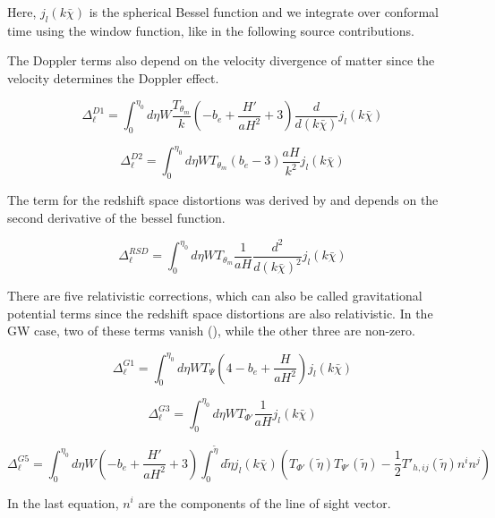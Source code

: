 Here, $j_l(k \bar{\chi})$ is the spherical Bessel function and we integrate over conformal time using the window function, like in the following source contributions.

The Doppler terms also depend on the velocity divergence of matter since the velocity determines the Doppler effect.

\begin{equation}
    \Delta_\ell^{D1}=\int_0^{\eta_0} d\eta W \frac{T_{\theta_m}}{k} \left(-b_e + \frac{H'}{aH^2}+3\right)\frac{d}{d(k\bar{\chi})} j_l(k \bar{\chi})
\end{equation}

\begin{equation}
    \Delta_\ell^{D2}=\int_0^{\eta_0} d\eta W T_{\theta_m}(b_e-3) \frac{aH}{k^2} j_l(k \bar{\chi})
\end{equation}

The term for the redshift space distortions was derived by \cite{kaiser_clustering_1987} and depends on the second derivative of the bessel function.

\begin{equation}
    \Delta_\ell^{RSD}=\int_0^{\eta_0} d\eta W T_{\theta_m} \frac{1}{aH}\frac{d^2}{d(k\bar{\chi})^2} j_l(k \bar{\chi})
\end{equation}

There are five relativistic corrections, which can also be called gravitational potential terms since the redshift space distortions are also relativistic. In the GW case, two of these terms vanish (\cite{dallarmi_dipole_2022}), while the other three are non-zero.

\begin{equation}
    \Delta_\ell^{G1}=\int_0^{\eta_0} d\eta W T_\Psi \left(4-b_e+\frac{H}{aH^2}\right) j_l(k \bar{\chi})
\end{equation}

\begin{equation}
    \Delta_\ell^{G3}=\int_0^{\eta_0} d\eta W T_{\Phi'} \frac{1}{aH} j_l(k \bar{\chi})
\end{equation}

\begin{equation}
    \Delta_\ell^{G5}=\int_0^{\eta_0} d\eta W \left(-b_e + \frac{H'}{aH^2} +3\right) \int_0^{\tilde{\eta}} d\tilde{\eta} j_l(k \bar{\chi}) \left( T_{\Phi'}(\tilde{\eta})T_{\Psi'}(\tilde{\eta})-\frac{1}{2}T'_{h, ij}(\tilde{\eta})n^i n^j \right)
\end{equation}

In the last equation, $n^i$ are the components of the line of sight vector.

